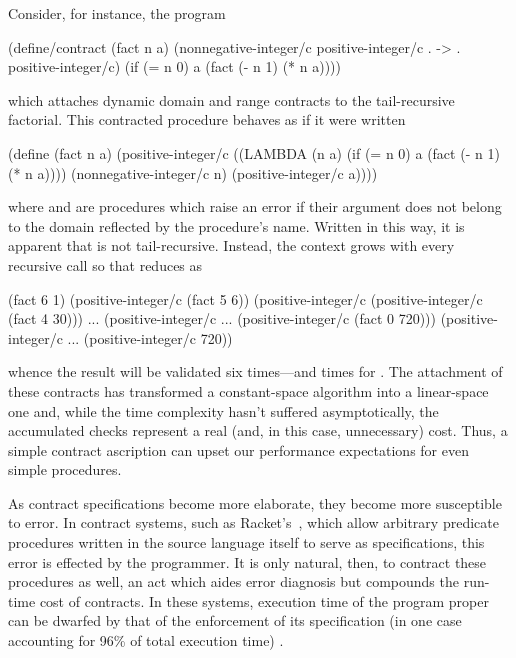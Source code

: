 \documentclass{sigplanconf}
\begin{document}
Consider, for instance, the program
\begin{schemedisplay}
(define/contract (fact n a)
  (nonnegative-integer/c positive-integer/c . -> . positive-integer/c)
  (if (= n 0)
      a
      (fact (- n 1) (* n a))))
\end{schemedisplay}
which attaches dynamic domain and range contracts to the tail-recursive factorial.
This contracted procedure behaves as if it were written
\begin{schemedisplay}
(define (fact n a)
  (positive-integer/c
   ((LAMBDA (n a)
      (if (= n 0)
          a
          (fact (- n 1) (* n a))))
    (nonnegative-integer/c n)
    (positive-integer/c a))))
\end{schemedisplay}
where  and  are procedures which raise an error if their argument does not belong to the domain reflected by the procedure's name.
Written in this way, it is apparent that  is not tail-recursive.
Instead, the context grows with every recursive call so that  reduces as
\begin{schemedisplay}
(fact 6 1)
(positive-integer/c (fact 5 6))
(positive-integer/c (positive-integer/c (fact 4 30)))
...
(positive-integer/c ... (positive-integer/c (fact 0 720)))
(positive-integer/c ... (positive-integer/c 720))
\end{schemedisplay}
whence the result will be validated six times---and  times for .
The attachment of these contracts has transformed a constant-space algorithm into a linear-space one and, while the time complexity hasn't suffered asymptotically, the accumulated checks represent a real (and, in this case, unnecessary) cost.
Thus, a simple contract ascription can upset our performance expectations for even simple procedures.

As contract specifications become more elaborate, they become more susceptible to error.
In contract systems, such as Racket's~\cite{plt-tr1}, which allow arbitrary predicate procedures written in the source language itself to serve as specifications, this error is effected by the programmer.
It is only natural, then, to contract these procedures as well, an act which aides error diagnosis but compounds the run-time cost of contracts.
In these systems, execution time of the program proper can be dwarfed by that of the enforcement of its specification (in one case accounting for 96\% of total execution time) \cite{strickland2012chaperones}.
\end{document}

